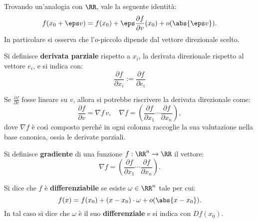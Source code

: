 \documentclass[12pt]{scrartcl}
\begin{document}
	\begin{remark}
		Trovando un'analogia con $\RR$, vale la seguente identità:
		\[ f(x_0 + \eps v) = f(x_0) + \eps \frac{\partial f}{\partial v}(x_0) + o(\abs{\eps v}). \]
		In particolare si osserva che l'$o$-piccolo dipende dal
		vettore direzionale scelto.
	\end{remark}
	
	\begin{definition}
		Si definisce \textbf{derivata parziale} rispetto a
		$x_i$, la derivata direzionale rispetto al vettore
		$e_i$, e si indica con:
		\[ \frac{\partial f}{\partial x_i} := \frac{\partial f}{\partial e_i} \]
	\end{definition}
	
	\begin{remark}
		Se $\frac{\partial f}{\partial v}$ fosse lineare su $v$,
		allora si potrebbe riscrivere la derivata direzionale come:
		\[ \frac{\partial f}{\partial v} = \nabla \! f \, v, \quad
			\nabla f = \left(\frac{\partial f}{\partial x_1} \cdots \frac{\partial f}{\partial x_n}\right), \]
		dove $\nabla f$ è così composto perché in ogni colonna
		raccoglie la sua valutazione nella base canonica, ossia
		le derivate parziali.
	\end{remark}
	
	\begin{definition}[gradiente di $f$]
		Si definisce \textbf{gradiente} di una funzione $f : \RR^n \to \RR$ il vettore:
		\[ \nabla f = \left(\frac{\partial f}{\partial x_1} \cdots \frac{\partial f}{\partial x_n}\right). \]
	\end{definition}
	
	\begin{definition}[differenziabilità]
		Si dice che $f$ è \textbf{differenziabile} se esiste
		$\omega \in \RR^n$ tale per cui:
		\[ f(x) = f(x_0) + (x-x_0) \cdot \omega + o(\abs{x-x_0}). \]
		In tal caso si dice che $\omega$ è il suo \textbf{differenziale} e si indica con $Df(x_0)$.
	\end{definition}
\end{document}
